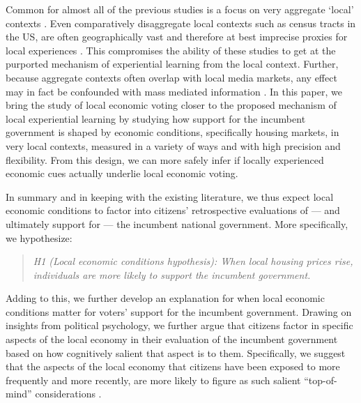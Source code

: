 \documentclass[12pt,a4paper]{article}
\begin{document}
	
	Common for almost all of the previous studies is a focus on very aggregate `local’ contexts \citep[for an exception see][]{bisgaard2016reconsidering,healy2017presidential}. Even comparatively disaggregate local contexts such as census tracts in the US, are often geographically vast and therefore at best imprecise proxies for local experiences \citep{ bisgaard2016reconsidering,dinesen2015ethnic,moore2017learning}. This compromises the ability of these studies to get at the purported mechanism of experiential learning from the local context. Further, because aggregate contexts often overlap with local media markets, any effect may in fact be confounded with mass mediated information \citep{books1999contextual,reeves2012ecologies}. In this paper, we bring the study of local economic voting closer to the proposed mechanism of local experiential learning by studying how support for the incumbent government is shaped by economic conditions, specifically housing markets, in very local contexts, measured in a variety of ways and with high precision and flexibility. From this design, we can more safely infer if locally experienced economic cues actually underlie local economic voting.
	
	In summary and in keeping with the existing literature, we thus expect local economic conditions to factor into citizens’ retrospective evaluations of — and ultimately support for — the incumbent national government. More specifically, we hypothesize:
	
	\newcommand{\hone}{the local economic conditions hypothesis}
	
	\begin{quote}
		
		\textit{H1 (Local economic conditions hypothesis): When local housing prices rise, individuals are more likely to support the incumbent government.}
		
	\end{quote}
	
	Adding to this, we further develop an explanation for when local economic conditions matter for voters’ support for the incumbent government. Drawing on insights from political psychology, we further argue that citizens factor in specific aspects of the local economy in their evaluation of the incumbent government based on how cognitively salient that aspect is to them. Specifically, we suggest that the aspects of the local economy that citizens have been exposed to more frequently and more recently, are more likely to figure as such salient ``top-of-mind'' considerations \citep{zaller1992nature}. 
	
\end{document}
